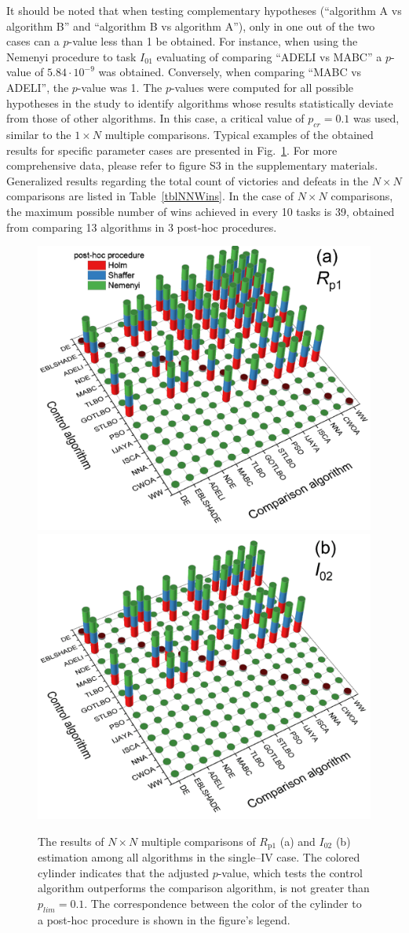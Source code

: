 \documentclass[a4paper,fleqn]{cas-sc}
\begin{document}
It should be noted that when testing complementary hypotheses
(``algorithm A vs algorithm B'' and ``algorithm B vs algorithm A''),
only in one out of the two cases can a $p$-value less than 1 be obtained.
For instance, when using the Nemenyi procedure to task $I_{01}$ evaluating of comparing ``ADELI vs MABC''
a $p$-value of $5.84\cdot10^{-9}$ was obtained.
Conversely, when comparing ``MABC vs ADELI'', the $p$-value was 1.
The $p$-values were computed for all possible hypotheses in the study to identify algorithms whose results statistically deviate from those of other algorithms.
In this case, a critical value of $p_{cr}=0.1$ was used, similar to the $1\times N$ multiple comparisons.
Typical examples of the obtained results for specific parameter cases are presented in Fig.~\ref{figNNRezSingleIV}.
For more comprehensive data, please refer to figure S3 in the supplementary materials.
Generalized results regarding the total count of victories and defeats in the $N\times N$ comparisons are listed in Table~\ref{tblNNWins}.
In the case of $N\times N$ comparisons, the maximum possible number of wins achieved in every 10 tasks is 39,
obtained from comparing 13 algorithms in 3 post-hoc procedures.

\begin{figure}[!ht]
	\centering
		\includegraphics[width=.49\textwidth]{Rp1shot_NN}
        \includegraphics[width=.49\textwidth]{I02shot_NN}
	  \caption{The results of $N\times N$ multiple comparisons of $R_\mathrm{p1}$ (a) and $I_{02}$ (b) estimation
               among all algorithms in the single--IV case.
               The colored cylinder indicates that the adjusted $p$-value,
               which tests the control algorithm outperforms the comparison algorithm,
               is not greater than $p_{lim}=0.1$.
               The correspondence between the color of the cylinder to a post-hoc procedure is shown in the figure's legend.
               }\label{figNNRezSingleIV}
\end{figure}
\end{document}
